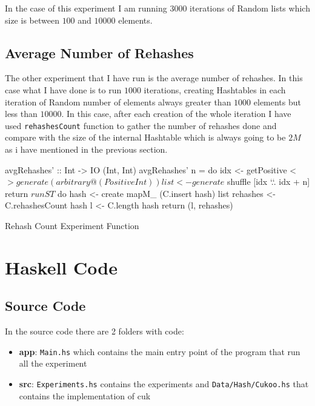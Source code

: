 \documentclass[12pt, a4paper]{article}
\begin{document}
In the case of this experiment I am running $3000$ iterations of Random lists which size is between $100$ and $10000$ elements.

\subsection{Average Number of Rehashes}
The other experiment that I have run is the average number of rehashes. In this case what I have done is to run $1000$ iterations, creating Hashtables in each iteration of Random number of elements always greater than $1000$ elements but less than $10000$. In this case, after each creation of the whole iteration I have used \texttt{rehashesCount} function to gather the number of rehashes done and compare with the size of the internal Hashtable which is always going to be $2M$ as i have mentioned in the previous section.

\begin{listing}[H]
\begin{haskellcode*}{}
avgRehashes' :: Int -> IO (Int, Int)
avgRehashes' n = do
  idx <- getPositive <$> generate (arbitrary @(Positive Int))
  list <- generate $ shuffle [idx `.`. idx + n]
  return $
    runST $ do
      hash <- create
      mapM_ (C.insert hash) list
      rehashes <- C.rehashesCount hash
      l        <- C.length hash
      return (l, rehashes)
\end{haskellcode*}
\caption{Rehash Count Experiment Function}
\label{lst:avgRehashes}
\end{listing}

\appendix\label{appendix}
\section{Haskell Code}
\subsection{Source Code}
In the source code there are 2 folders with code:

\begin{itemize}
  \item \textbf{app}: \texttt{Main.hs} which contains the main entry point of the program that run all the experiment
  \item \textbf{src}: \texttt{Experiments.hs} contains the experiments and \texttt{Data/Hash/Cukoo.hs} that contains the implementation of \acrshort{cuk}
\end{itemize}
\end{document}
